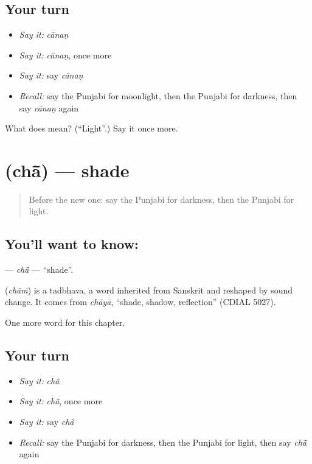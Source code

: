 \subsection*{Your turn}
\begin{itemize}
\raggedright
  \item \emph{Say it:} \emph{cānaṇ}
  \item \emph{Say it:} \emph{cānaṇ}, once more
  \item \emph{Say it:} say \emph{cānaṇ}
  \item \emph{Recall:} say the Punjabi for moonlight, then the Punjabi for darkness, then say \emph{cānaṇ} again
\end{itemize}

\begin{tcolorbox}[breakable,colback=teal!4,colframe=teal!35!black,title={Before you move on}]
What does  mean? (\textquotedblleft{}Light\textquotedblright{}.) Say it once more.
\end{tcolorbox}
\section[\texorpdfstring{\pa{ਛਾਂ} (chā̃)}{ਛਾਂ (chā̃)}]{ (chā̃) — shade}

\label{lesson:PA-C129-cha}



\begin{quote}
Before the new one: say the Punjabi for darkness, then the Punjabi for light.
\end{quote}

\subsection*{You'll want to know: }
\textbf{} — \emph{chā̃} — \textquotedblleft{}shade\textquotedblright{}.

\begin{cousinweb}
\textbf{} (\emph{chāṁ}) is a tadbhava, a word inherited from Sanskrit and reshaped by sound change. It comes from \emph{chāyā}, \textquotedblleft{}shade, shadow, reflection\textquotedblright{} (CDIAL 5027).
\end{cousinweb}

\begin{grammarlens}[title={What you've built}]
One more word for this chapter.
\end{grammarlens}

\subsection*{Your turn}
\begin{itemize}
\raggedright
  \item \emph{Say it:} \emph{chā̃}
  \item \emph{Say it:} \emph{chā̃}, once more
  \item \emph{Say it:} say \emph{chā̃}
  \item \emph{Recall:} say the Punjabi for darkness, then the Punjabi for light, then say \emph{chā̃} again
\end{itemize}

